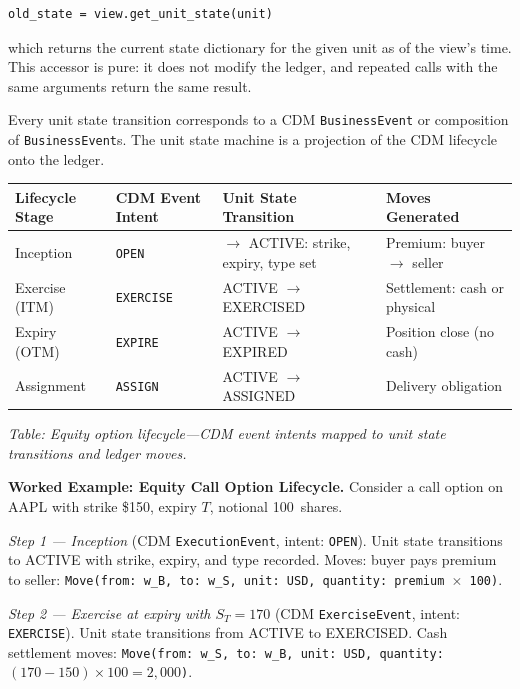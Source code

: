 \documentclass[11pt,a4paper]{article}
\begin{document}
\begin{lstlisting}
old_state = view.get_unit_state(unit)
\end{lstlisting}

\noindent which returns the current state dictionary for the given unit as of the view's time. This accessor is pure: it does not modify the ledger, and repeated calls with the same arguments return the same result.

Every unit state transition corresponds to a CDM \texttt{BusinessEvent} or composition of \texttt{BusinessEvent}s. The unit state machine is a projection of the CDM lifecycle onto the ledger.

\begin{center}
\begin{tabular}{l l l l}
\toprule
\textbf{Lifecycle Stage} & \textbf{CDM Event Intent} & \textbf{Unit State Transition} & \textbf{Moves Generated} \\
\midrule
Inception & \texttt{OPEN} & $\to$ ACTIVE: strike, expiry, type set & Premium: buyer $\to$ seller \\
Exercise (ITM) & \texttt{EXERCISE} & ACTIVE $\to$ EXERCISED & Settlement: cash or physical \\
Expiry (OTM) & \texttt{EXPIRE} & ACTIVE $\to$ EXPIRED & Position close (no cash) \\
Assignment & \texttt{ASSIGN} & ACTIVE $\to$ ASSIGNED & Delivery obligation \\
\bottomrule
\end{tabular}
\end{center}

\noindent\textit{Table: Equity option lifecycle---CDM event intents mapped to unit state transitions and ledger moves.}

\medskip

\noindent\textbf{Worked Example: Equity Call Option Lifecycle.}
Consider a call option on AAPL with strike \$150, expiry $T$, notional 100~shares.

\noindent\textit{Step 1 --- Inception} (CDM \texttt{ExecutionEvent}, intent: \texttt{OPEN}). Unit state transitions to ACTIVE with strike, expiry, and type recorded. Moves: buyer pays premium to seller: \texttt{Move(from: w\_B, to: w\_S, unit: USD, quantity: premium~$\times$~100)}.

\noindent\textit{Step 2 --- Exercise at expiry with $S_T = 170$} (CDM \texttt{ExerciseEvent}, intent: \texttt{EXERCISE}). Unit state transitions from ACTIVE to EXERCISED. Cash settlement moves: \texttt{Move(from: w\_S, to: w\_B, unit: USD, quantity: $(170-150) \times 100 = 2{,}000$)}.
\end{document}
